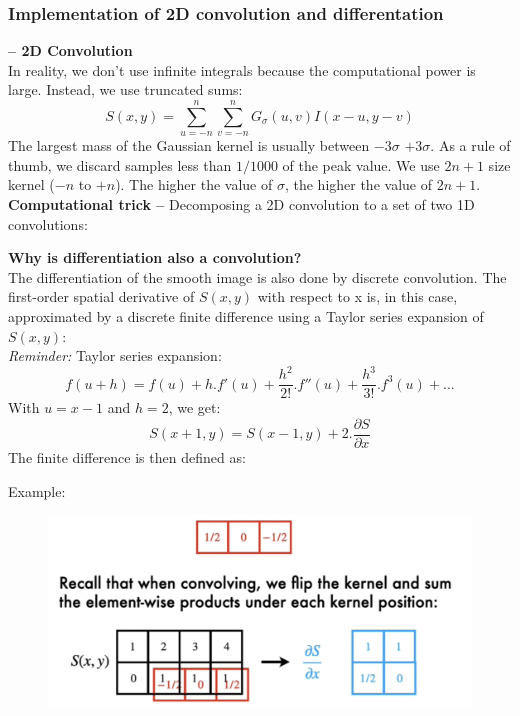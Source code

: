 \documentclass[a4paper,11pt]{article}
\begin{document}
\subsubsection{Implementation of 2D convolution and differentation}
\textbf{-- 2D Convolution}\\
In reality, we don't use infinite integrals because the computational power is large. Instead, we use truncated sums:
\[S(x,y)=\sum_{u=-n}^{n}\sum_{v=-n}^{n} G_\sigma(u,v) I(x-u,y-v)\]
The largest mass of the Gaussian kernel is usually between $-3 \sigma$ $+3 \sigma$. As a rule of thumb, we discard samples less than $1/1000$ of the peak value.
We use $2n+1$ size kernel ($-n$ to $+n$). The higher the value of $\sigma$, the higher the value of $2n+1$.
\vspace{5pt}\\
\textbf{Computational trick --} Decomposing a 2D convolution to a set of two 1D convolutions:
\begin{center}
\end{center}
\textbf{Why is differentiation also a convolution?}\\
The differentiation of the smooth image is also done by discrete convolution. The first-order spatial derivative of $S(x,y)$ with respect to x is, in this case, approximated by a discrete finite difference using a Taylor series expansion of $S(x,y)$:
\vspace{5pt}\\
\emph{Reminder:} Taylor series expansion:
\[f(u+h)=f(u)+h.f'(u)+\frac{h^2}{2!}.f''(u)+\frac{h^3}{3!}.f^{3}(u)+...\]
With $u=x-1$ and $h=2$, we get:
\[S(x+1,y)=S(x-1,y)+2.\frac{\partial S}{\partial x}\]
The finite difference is then defined as:
\begin{center}
\end{center}
Example:
\begin{figure}[h]
	\centering
	\includegraphics[width=.6\linewidth]{figures/diff.png}
\end{figure}
\end{document}
